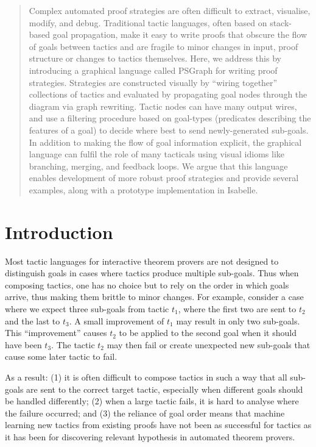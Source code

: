 \documentclass{llncs}
\begin{document}
\begin{abstract}
Complex automated proof strategies are often difficult to extract, visualise, modify, and debug. 
Traditional tactic languages, often based on stack-based goal propagation, make it easy to write proofs that obscure the flow of goals between tactics and are fragile to minor changes in input, proof structure or changes to tactics themselves. Here, we address this by introducing a graphical language called PSGraph for writing proof strategies. Strategies are constructed visually by ``wiring together'' collections of tactics and evaluated by propagating goal nodes through the diagram via graph rewriting. Tactic nodes can have many output wires, and use a filtering procedure based on goal-types (predicates describing the features of a goal) to decide where best to send newly-generated sub-goals. 
In addition to making the flow of goal information explicit, the graphical language can fulfil the role of many tacticals using visual idioms like branching, merging, and feedback loops. We argue that this language enables development of more robust proof strategies and provide several examples, along with a prototype implementation in Isabelle.
\end{abstract}

\vspace{-0.6em}
\beforesection
\section{Introduction}\label{sec:intro}
\aftersection

Most tactic languages for interactive theorem provers are not designed to distinguish goals in cases where tactics
produce multiple sub-goals. Thus when composing tactics, one  has no choice but to rely on the order in which goals
arrive, thus making them brittle to minor changes.  For example, consider a case where we expect three sub-goals from
tactic $t_1$, where the first two are sent to $t_2$ and the last to $t_3$. A small improvement of $t_1$ may result in
only two sub-goals. This ``improvement'' causes $t_2$ to be applied to the second goal when it should have been $t_3$.
The tactic $t_2$ may then fail or create unexpected new sub-goals that cause some later tactic to fail.

As a result: (1) it is often difficult to compose tactics in such a way that all sub-goals are sent to the correct
target tactic, especially when different goals should be handled differently; (2) when a large tactic fails, it is hard
to analyse where the failure occurred; and (3) the reliance of goal order means that machine learning new tactics from existing
proofs have not been as successful for tactics as it has been for discovering relevant hypothesis in automated theorem
provers.
\end{document}
